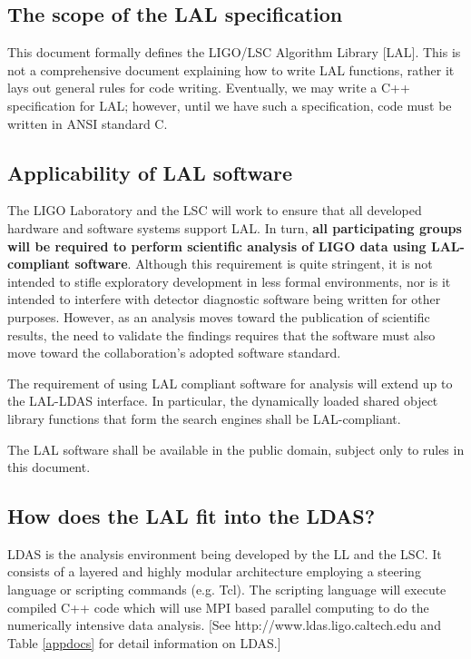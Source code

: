\documentclass[]{ligodcc}
\begin{document}
\subsection{The scope of the LAL specification}

This document formally defines the LIGO/LSC Algorithm Library [LAL].
This is not a comprehensive document explaining how to write LAL
functions, rather it lays out general rules for code writing.
Eventually, we may write a C++ specification for LAL; however, until
we have such a specification, code must be written in  ANSI standard
C.

\subsection{Applicability of LAL software}

The LIGO Laboratory and the LSC will work to ensure that all developed
hardware and software systems support LAL. In turn,  {\bf all
participating groups will be required to perform scientific analysis
of  LIGO data using LAL-compliant software}.  Although this
requirement is quite stringent, it is not intended to stifle
exploratory development in less formal environments, nor is  it
intended to interfere with detector diagnostic software being written
for other purposes.  However, as an analysis moves toward the
publication of scientific results, the need to validate the findings
requires that the software must also move toward the collaboration's
adopted software standard.

The requirement of using LAL compliant software for analysis will
extend up to the LAL-LDAS interface. In particular, the dynamically
loaded shared object library functions that form the search engines
shall be LAL-compliant.

The LAL software shall be available in the public domain, subject only
to rules in this document.


\subsection{How does the LAL fit into the  LDAS?}

LDAS is the analysis environment being developed by the LL and the LSC.
It consists of a layered and highly modular architecture employing a
steering language or scripting commands (e.g. Tcl).  The scripting
language  will execute compiled   C++ code which will use MPI  based
parallel computing to do the numerically intensive data analysis. [See
http://www.ldas.ligo.caltech.edu  and Table \ref{appdocs} for detail information
on LDAS.]
\end{document}
